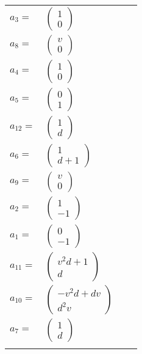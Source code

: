 \documentclass[1p]{elsarticle_modified}
\theoremstyle{definition}
\begin{document}
\begin{tabular}{m{7pt} m{180pt} m{7pt} m{180pt} }
\flushright $a_{3}=$&$\begin{pmatrix}1\\0\end{pmatrix}$ \\
\flushright $a_{8}=$&$\begin{pmatrix}v\\0\end{pmatrix}$ \\
\flushright $a_{4}=$&$\begin{pmatrix}1\\0\end{pmatrix}$ \\
\flushright $a_{5}=$&$\begin{pmatrix}0\\1\end{pmatrix}$ \\
\flushright $a_{12}=$&$\begin{pmatrix}1\\d\end{pmatrix}$ \\
\flushright $a_{6}=$&$\begin{pmatrix}1\\d+1\end{pmatrix}$ \\
\flushright $a_{9}=$&$\begin{pmatrix}v\\0\end{pmatrix}$ \\
\flushright $a_{2}=$&$\begin{pmatrix}1\\-1\end{pmatrix}$ \\
\flushright $a_{1}=$&$\begin{pmatrix}0\\-1\end{pmatrix}$ \\
\flushright $a_{11}=$&$\begin{pmatrix}v^2 d+1\\d\end{pmatrix}$ \\
\flushright $a_{10}=$&$\begin{pmatrix}- v^2 d+d v\\d^2 v\end{pmatrix}$ \\
\flushright $a_{7}=$&$\begin{pmatrix}1\\d\end{pmatrix}$\\&\end{tabular}
\end{document}
